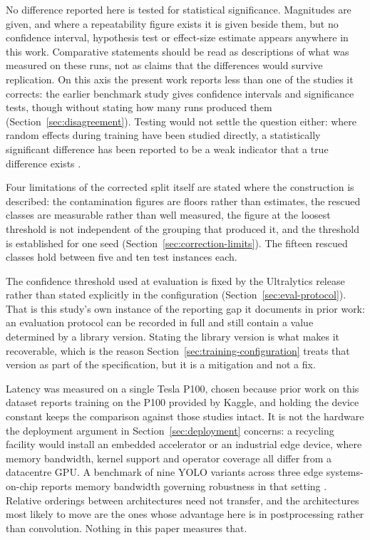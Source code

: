 No difference reported here is tested for statistical significance. Magnitudes
are given, and where a repeatability figure exists it is given beside them, but
no confidence interval, hypothesis test or effect-size estimate appears anywhere
in this work. Comparative statements should be read as descriptions of what was
measured on these runs, not as claims that the differences would survive
replication. On this axis the present work reports less than one of the studies
it corrects: the earlier benchmark study gives confidence intervals and
significance tests, though without stating how many runs produced them
(Section~\ref{sec:disagreement}). Testing would not settle the question either:
where random effects during training have been studied directly, a
statistically significant difference has been reported to be a weak indicator
that a true difference exists \citep{akesson2024random}.

Four limitations of the corrected split itself are stated where the construction
is described: the contamination figures are floors rather than estimates, the
rescued classes are measurable rather than well measured, the figure at the
loosest threshold is not independent of the grouping that produced it, and the
threshold is established for one seed
(Section~\ref{sec:correction-limits}). The fifteen rescued classes hold between
five and ten test instances each.

The confidence threshold used at evaluation is fixed by the Ultralytics release
rather than stated explicitly in the configuration
(Section~\ref{sec:eval-protocol}). That is this study's own instance of the
reporting gap it documents in prior work: an evaluation protocol can be recorded
in full and still contain a value determined by a library version. Stating the
library version is what makes it recoverable, which is the reason
Section~\ref{sec:training-configuration} treats that version as part of the
specification, but it is a mitigation and not a fix.

Latency was measured on a single Tesla P100, chosen because prior work on this
dataset reports training on the P100 provided by Kaggle, and holding the device
constant keeps the comparison against those studies intact. It is not the hardware the deployment argument in
Section~\ref{sec:deployment} concerns: a recycling facility would install an
embedded accelerator or an industrial edge device, where memory bandwidth,
kernel support and operator coverage all differ from a datacentre GPU. A
benchmark of nine YOLO variants across three edge systems-on-chip reports memory
bandwidth governing robustness in that setting \citep{kong2026edge}. Relative
orderings between architectures need not transfer, and the architectures most
likely to move are the ones whose advantage here is in postprocessing rather
than convolution. Nothing in this paper measures that.

